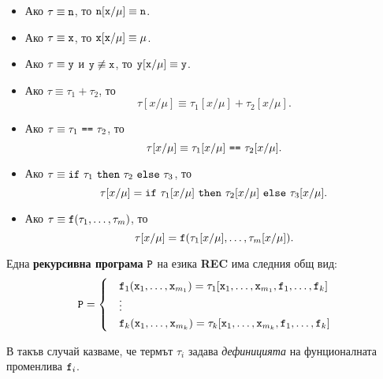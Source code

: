 \begin{itemize}
\begin{itemize}
  \item
    Ако $\tau \equiv \texttt{n}$, то $\texttt{n}[\texttt{x}/\mu] \equiv \texttt{n}$.
  \item
    Ако $\tau \equiv \texttt{x}$, то $\texttt{x}[\texttt{x}/\mu] \equiv \mu$.
  \item
    Ако $\tau \equiv \texttt{y}$ и $\texttt{y} \not\equiv \texttt{x}$, то $\texttt{y}[\texttt{x}/\mu] \equiv \texttt{y}$.
  \item
    Ако $\tau \equiv \tau_1 + \tau_2$, то
    \[\tau[x/\mu] \equiv \tau_1[x/\mu] + \tau_2[x/\mu].\]
  \item
    Ако $\tau \equiv \tau_1\ \vv{==}\ \tau_2$, то
    \[\tau[x/\mu] \equiv \tau_1[x/\mu]\ \texttt{==}\ \tau_2[x/\mu].\]
  \item
    Ако $\tau \equiv \texttt{if}\ \tau_1\ \texttt{then}\ \tau_2\ \texttt{else}\ \tau_3$, то
    \[\tau[x/\mu] = \texttt{if}\ \tau_1[x/\mu]\ \texttt{then}\ \tau_2[x/\mu]\ \texttt{else}\ \tau_3[x/\mu].\]
  \item
    Ако $\tau \equiv \texttt{f}(\tau_1,\dots,\tau_m)$, то
    \[\tau[x/\mu] = \texttt{f}(\tau_1[x/\mu], \dots, \tau_m[x/\mu]).\]
  \end{itemize}  
\end{itemize}


Една {\bf рекурсивна програма} $\texttt{P}$ на езика {\bf REC} има следния общ вид:
\begin{align*}
  \texttt{P} = 
  \begin{cases}
    & \texttt{f}_1(\texttt{x}_1,\dots,\texttt{x}_{m_1}) = \tau_1[\texttt{x}_1,\dots,\texttt{x}_{m_1},\texttt{f}_1,\dots,\texttt{f}_k]\\
    & \vdots\\
    & \texttt{f}_k(\texttt{x}_1,\dots,\texttt{x}_{m_k}) = \tau_k[\texttt{x}_1,\dots,\texttt{x}_{m_k},\texttt{f}_1,\dots,\texttt{f}_k]
  \end{cases}
\end{align*}

В такъв случай казваме, че термът $\tau_i$ задава {\em дефиницията} на фунционалната променлива $\texttt{f}_i$.

